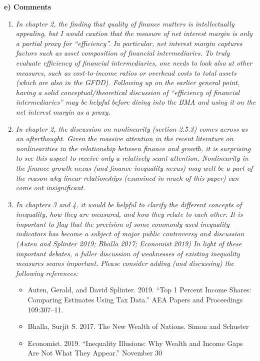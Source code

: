 \textbf{e) Comments}
\begin{enumerate}
    \item \textit{In chapter 2, the finding that quality of finance matters is intellectually appealing, but I would caution that the measure of net interest margin is only a partial proxy for ``efficiency''. In particular, net interest margin captures factors such as asset composition of financial intermediaries. To truly evaluate efficiency of financial intermediaries, one needs to look also at other measures, such as cost-to-income ratios or overhead costs to total assets (which are also in the GFDD). Following up on the earlier general point, having a solid conceptual/theoretical discussion of ``efficiency of financial intermediaries'' may be helpful before diving into the BMA and using it on the net interest margin as a proxy.}
    
    \item \textit{In chapter 2, the discussion on nonlinearity (section 2.5.3) comes across as an afterthought. Given the massive attention in the recent literature on nonlinearities in the relationship between finance and growth, it is surprising to see this aspect to receive only a relatively scant attention. Nonlinearity in the finance-growth nexus (and finance-inequality nexus) may well be a part of the reason why linear relationships (examined in much of this paper) can come out insignificant.}
    
    \item \textit{In chapters 3 and 4, it would be helpful to clarify the different concepts of inequality, how they are measured, and how they relate to each other. It is important to flag that the precision of some commonly used inequality indicators has become a subject of major public controversy and discussion (Auten and Splinter 2019; Bhalla 2017; Economist 2019) In light of these important debates, a fuller discussion of weaknesses of existing inequality measures seams important. Please consider adding (and discussing) the following references:}
     \begin{itemize}
        \item Auten, Gerald, and David Splinter. 2019. ``Top 1 Percent Income Shares: Comparing Estimates Using Tax Data.'' AEA Papers and Proceedings 109:307–11.
        \item Bhalla, Surjit S. 2017. The New Wealth of Nations. Simon and Schuster
        \item Economist. 2019. ``Inequality Illusions: Why Wealth and Income Gaps Are Not What They Appear.'' November 30
     \end{itemize}


\end{enumerate}
